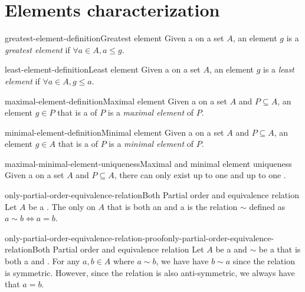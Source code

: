 \documentclass[preview]{standalone}
\begin{document}
\section{Elements characterization}

\begin{snippetdefinition}{greatest-element-definition}{Greatest element}
    Given a \partialorder on a set \(A\), an element \(g\) is a \textit{greatest element}
    if \(\forall a\in A, a \leq g\).
\end{snippetdefinition}

\begin{snippetdefinition}{least-element-definition}{Least element}
    Given a \partialorder on a set \(A\), an element \(g\) is a \textit{least element}
    if \(\forall a\in A, g \leq a\).
\end{snippetdefinition}

\begin{snippetdefinition}{maximal-element-definition}{Maximal element}
    Given a \partialorder on a set \(A\) and \(P\subseteq A\), an element \(g\in P\) that is
    a  of \(P\) is a \textit{maximal element} of \(P\).
\end{snippetdefinition}

\begin{snippetdefinition}{minimal-element-definition}{Minimal element}
    Given a \partialorder on a set \(A\) and \(P\subseteq A\), an element \(g\in A\) that is
    a  of \(P\) is a \textit{minimal element} of \(P\).
\end{snippetdefinition}

\begin{snippetcorollary}{maximal-minimal-element-uniqueness}{Maximal and minimal element uniqueness}
    Given a \partialorder on a set \(A\) and \(P\subseteq A\), there can only exist
    up to one  and up to one .
\end{snippetcorollary}


\begin{snippettheorem}{only-partial-order-equivalence-relation}{Both Partial order and equivalence relation}
    Let \(A\) be a \set. The only \binrelation on \(A\) that is both an
    \equivrelation and a \partialorder is the relation \(\sim\) defined as
    \(a \sim b \iff a = b\).
\end{snippettheorem}

\begin{snippetproof}{only-partial-order-equivalence-relation-proof}{only-partial-order-equivalence-relation}{Both Partial order and equivalence relation}
    Let \(A\) be a \set and \(\sim\) be a \binrelation that is both a \partialorder and \equivrelation.
    For any \(a,b\in A\) where \(a\sim b\), we have have \(b\sim a\) since the relation is symmetric.
    However, since the relation is also anti-symmetric, we always have that \(a=b\).
\end{snippetproof}
\end{document}
